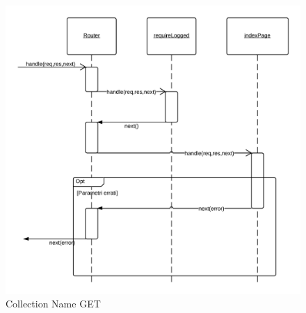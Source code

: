 \begin{figure}[H]
	\begin{center} 
		\includegraphics[scale=0.20]{scenari/Collection Name GET.png} 
		\caption{Collection Name GET}
	\end{center} 
\end{figure}

